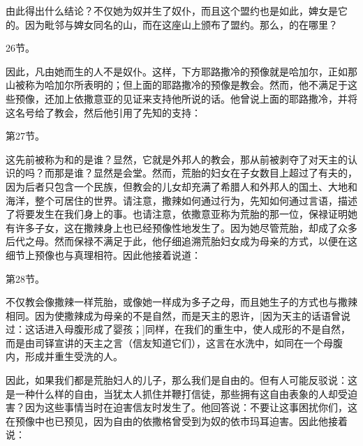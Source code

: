由此得出什么结论？不仅她为奴并生了奴仆，而且这个盟约也是如此，婢女是它的。因为毗邻与婢女同名的山，而在这座山上颁布了盟约。那么，的在哪里？\par

26节。\par

因此，凡由她而生的人不是奴仆。这样，下方耶路撒冷的预像就是哈加尔，正如那山被称为哈加尔所表明的；但上面的耶路撒冷的预像是教会。然而，他不满足于这些预像，还加上依撒意亚的见证来支持他所说的话。他曾说上面的耶路撒冷，并将这名号给了教会，然后他引用了先知的支持：\par

第27节。\par

这先前被称为和的是谁？显然，它就是外邦人的教会，那从前被剥夺了对天主的认识的吗？而那是谁？显然是会堂。然而，荒胎的妇女在子女数目上超过了有夫的，因为后者只包含一个民族，但教会的儿女却充满了希腊人和外邦人的国土、大地和海洋，整个可居住的世界。请注意，撒辣如何通过行为，先知如何通过言语，描述了将要发生在我们身上的事。也请注意，依撒意亚称为荒胎的那一位，保禄证明她有许多子女，这在撒辣身上也已经预像性地发生了。因为她尽管荒胎，却成了众多后代之母。然而保禄不满足于此，他仔细追溯荒胎妇女成为母亲的方式，以便在这细节上预像也与真理相符。因此他接着说道：\par

第28节。\par

不仅教会像撒辣一样荒胎，或像她一样成为多子之母，而且她生子的方式也与撒辣相同。因为使撒辣成为母亲的不是自然，而是天主的恩许，[因为天主的话语曾说过：这话进入母腹形成了婴孩；]同样，在我们的重生中，使人成形的不是自然，而是由司铎宣讲的天主之言（信友知道它们），这言在水洗中，如同在一个母腹内，形成并重生受洗的人。\par

因此，如果我们都是荒胎妇人的儿子，那么我们是自由的。但有人可能反驳说：这是一种什么样的自由，当犹太人抓住并鞭打信徒，那些拥有这自由表象的人却受迫害？因为这些事情当时在迫害信友时发生了。他回答说：不要让这事困扰你们，这在预像中也已预见，因为自由的依撒格曾受到为奴的依市玛耳迫害。因此他接着说：\par

